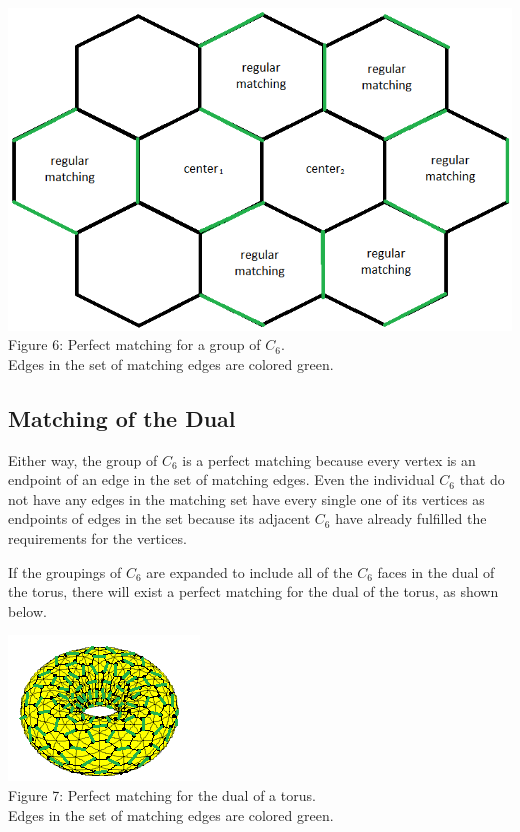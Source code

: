 \documentclass[12pt]{article}
\begin{document}
\begin{flushleft}
\begin{center}
\includegraphics[scale=0.65]{images/c6groupmatching.png}\\
Figure 6: Perfect matching for a group of $C_6$.\\
Edges in the set of matching edges are colored green.
\end{center}

\subsection*{Matching of the Dual}
\medskip
Either way, the group of $C_6$ is a perfect matching because every vertex is an endpoint of an edge in the set of matching edges. Even the individual $C_6$ that do not have any edges in the matching set have every single one of its vertices as endpoints of edges in the set because its adjacent $C_6$ have already fulfilled the requirements for the vertices.

\medskip
If the groupings of $C_6$ are expanded to include all of the $C_6$ faces in the dual of the torus, there will exist a perfect matching for the dual of the torus, as shown below.

\begin{center}
\includegraphics[scale=1.7]{images/torusmatching.png}\\
Figure 7: Perfect matching for the dual of a torus.\\
Edges in the set of matching edges are colored green.
\end{center}


\end{flushleft}
\end{document}
